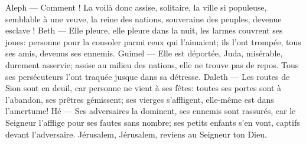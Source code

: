 Aleph --- Comment ! La voilà donc assise, solitaire, la ville si populeuse,
	semblable à une veuve, la reine des nations,
	souveraine des peuples, devenue esclave !
Beth --- Elle pleure, elle pleure dans la nuit, les larmes couvrent ses joues:
	personne pour la consoler parmi ceux qui l’aimaient;
	ils l’ont trompée, tous ses amis, devenus ses ennemis.
Guimel --- Elle est déportée, Juda, misérable, durement asservie;
	assise au milieu des nations, elle ne trouve pas de repos.
	Tous ses persécuteurs l’ont traquée jusque dans sa détresse.
Daleth --- Les routes de Sion sont en deuil, car personne ne vient à ses fêtes:
	toutes ses portes sont à l’abandon, ses prêtres gémissent;
	ses vierges s’affligent, elle-même est dans l’amertume!
Hé --- Ses adversaires la dominent, ses ennemis sont rassurés,
	car le Seigneur l’afflige pour ses fautes sans nombre;
	ses petits enfants s’en vont, captifs devant l’adversaire.
Jérusalem, Jérusalem, reviens au Seigneur ton Dieu.
